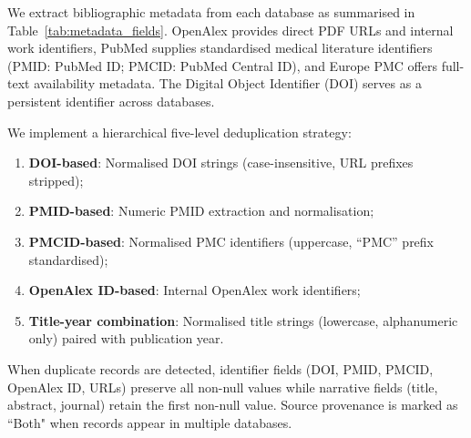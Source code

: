 We extract bibliographic metadata from each database as summarised in Table~\ref{tab:metadata_fields}. OpenAlex provides direct PDF URLs and internal work identifiers, PubMed supplies standardised medical literature identifiers (PMID: PubMed ID; PMCID: PubMed Central ID), and Europe PMC offers full-text availability metadata. The Digital Object Identifier (DOI) serves as a persistent identifier across databases.

We implement a hierarchical five-level deduplication strategy:

\begin{enumerate}
\item \textbf{DOI-based}: Normalised DOI strings (case-insensitive, URL prefixes stripped);
\item \textbf{PMID-based}: Numeric PMID extraction and normalisation;
\item \textbf{PMCID-based}: Normalised PMC identifiers (uppercase, ``PMC'' prefix standardised);
\item \textbf{OpenAlex ID-based}: Internal OpenAlex work identifiers;
\item \textbf{Title-year combination}: Normalised title strings (lowercase, alphanumeric only) paired with publication year.
\end{enumerate}

When duplicate records are detected, identifier fields (DOI, PMID, PMCID, OpenAlex ID, URLs) preserve all non-null values while narrative fields (title, abstract, journal) retain the first non-null value. Source provenance is marked as ``Both" when records appear in multiple databases.

